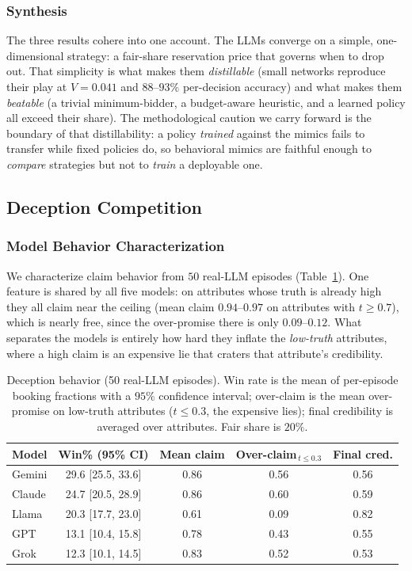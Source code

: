 \documentclass[conference]{IEEEtran}
\begin{document}
\subsubsection{Synthesis}
The three results cohere into one account. The LLMs converge on a simple, one-dimensional strategy: a fair-share reservation price that governs when to drop out. That simplicity is what makes them \emph{distillable} (small networks reproduce their play at $V = 0.041$ and $88$--$93\%$ per-decision accuracy) and what makes them \emph{beatable} (a trivial minimum-bidder, a budget-aware heuristic, and a learned policy all exceed their share). The methodological caution we carry forward is the boundary of that distillability: a policy \emph{trained} against the mimics fails to transfer while fixed policies do, so behavioral mimics are faithful enough to \emph{compare} strategies but not to \emph{train} a deployable one.

\subsection{Deception Competition}

\subsubsection{Model Behavior Characterization}
We characterize claim behavior from $50$ real-LLM episodes (Table~\ref{tab:dec5_behavior}). One feature is shared by all five models: on attributes whose truth is already high they all claim near the ceiling (mean claim $0.94$--$0.97$ on attributes with $t\ge0.7$), which is nearly free, since the over-promise there is only $0.09$--$0.12$. What separates the models is entirely how hard they inflate the \emph{low-truth} attributes, where a high claim is an expensive lie that craters that attribute's credibility.

\begin{table}[htbp]
\caption{Deception behavior (50 real-LLM episodes). Win rate is the mean of per-episode booking fractions with a $95\%$ confidence interval; over-claim is the mean over-promise on low-truth attributes ($t\le0.3$, the expensive lies); final credibility is averaged over attributes. Fair share is $20\%$.}
\label{tab:dec5_behavior}
\centering
\begin{tabular}{lcccc}
\hline
Model & Win\% (95\% CI) & Mean claim & Over-claim$_{\,t\le0.3}$ & Final cred. \\
\hline
Gemini & 29.6 [25.5, 33.6] & 0.86 & 0.56 & 0.56 \\
Claude & 24.7 [20.5, 28.9] & 0.86 & 0.60 & 0.59 \\
Llama & 20.3 [17.7, 23.0] & 0.61 & 0.09 & 0.82 \\
GPT   & 13.1 [10.4, 15.8] & 0.78 & 0.43 & 0.55 \\
Grok  & 12.3 [10.1, 14.5] & 0.83 & 0.52 & 0.53 \\
\hline
\end{tabular}
\end{table}
\end{document}
